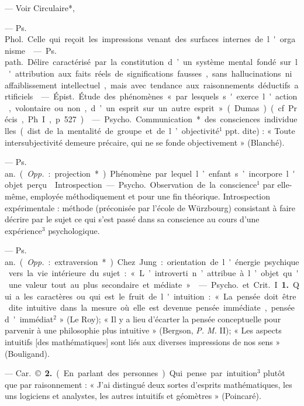 \begin{itemize}[leftmargin=1cm, label=, itemsep=1pt]
 — Voir Circulaire*,

 — Ps. \si{Phol.}
Celle qui reçoit les impressions
venant des surfaces internes de
l'organisme.

 — \si{Ps. path.}
Délire caractérisé par la constitution d’un système mental fondé sur
l'attribution aux faits réels de significations fausses, sans hallucinations ni affaiblissement intellectuel,
mais avec tendance aux raisonnements déductifs artificiels.

 — \si{Épist.} Étude des
phénomènes « par lesquels s'exerce
l'action, volontaire ou non, d’un
esprit sur un autre esprit » (Dumas)
(cf. Précis, Ph. I, p. 527).

 — \si{Psycho.} Communication* des consciences individuelles (dist. de la mentalité de
groupe et de l’objectivité$^1$ ppt. dite) :
« Toute intersubjectivité demeure
précaire, qui ne se fonde objectivement » (Blanché).

 — \si{Ps. an.} ({\it Opp.} : projection*) Phénomène par lequel l’enfant
s’incorpore l'objet perçu.

\ib{}Introspection. — \si{Psycho.} Observation
de la conscience$^1$ par elle-même,
employée méthodiquement et pour
une fin théorique. Introspection
expérimentale : méthode (préconisée
par l’école de Würzbourg) consistant à faire décrire par le sujet ce
qui s’est passé dans sa conscience
au cours d'une expérience$^3$ psychologique.

 — \si{Ps. an.} ({\it Opp.} : extraversion*). Chez Jung : orientation
de l'énergie psychique vers la vie
intérieure du sujet : « L’introverti
n’attribue à l’objet qu'une valeur
tout au plus secondaire et médiate. »

 — \si{Psycho.} et \si{Crit.} I {\bf 1.} Qui a
les caractères ou qui est le fruit de
l'intuition : « La pensée doit être
dite intuitive dans la mesure où
elle est devenue pensée immédiate,
pensée d'immédiat$^2$ » (Le Roy); « Il
y a lieu d’écarter la pensée conceptuelle pour parvenir à une philosophie plus intuitive » (Bergson,
{\it P. M.} II); « Les aspects intuitifs
[des mathématiques] sont liés aux
diverses impressions de nos sens »
(Bouligand).

— \si{Car.} ©. {\bf 2.} (En parlant des
personnes). Qui pense par intuition$^3$ plutôt que par raisonnement :
« J'ai distingué deux sortes d’esprits
mathématiques, les uns logiciens et
analystes, les autres intuitifs et
géomètres » (Poincaré).


\end{itemize}
